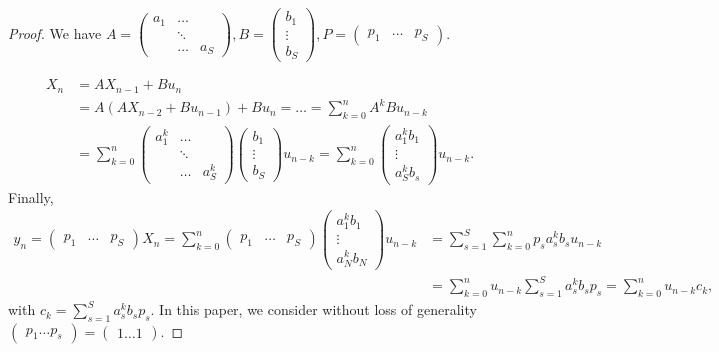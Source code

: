 \begin{proof}
    We have $A = \begin{pmatrix}
        a_1 & \dots & \\
        & \ddots & \\
        & \dots & a_S
    \end{pmatrix}, B = \begin{pmatrix}
        b_1\\
        \vdots\\
        b_S
    \end{pmatrix}, P = \begin{pmatrix}
        p_1 & \dots & p_S
    \end{pmatrix}$.

\begin{align*}
    X_n &= AX_{n-1} + Bu_n\\
    &= A(AX_{n-2} + Bu_{n-1}) + Bu_n  = \dots = \sum_{k=0}^nA^kBu_{n-k}\\
    &= \sum_{k=0}^n\begin{pmatrix}
        a_1^k & \dots & \\
        & \ddots & \\
        & \dots & a_S^k
    \end{pmatrix}\begin{pmatrix}
        b_1\\\vdots\\b_S
    \end{pmatrix}u_{n-k} = \sum_{k=0}^n\begin{pmatrix}
        a_1^kb_1\\\vdots \\a_S^kb_s
    \end{pmatrix}u_{n-k}.
\end{align*}
Finally,
\begin{align*}
    y_n = \begin{pmatrix}
        p_1 & \dots & p_S
    \end{pmatrix}X_n = \sum_{k=0}^n\begin{pmatrix}
        p_1 & \dots & p_S
    \end{pmatrix}\begin{pmatrix}
        a_1^kb_1\\\vdots\\a_N^kb_N
    \end{pmatrix}u_{n-k} & = \sum_{s=1}^S\sum_{k=0}^np_sa_s^kb_su_{n-k}\\
    &=\sum_{k=0}^nu_{n-k}\sum_{s=1}^Sa_s^kb_sp_s = \sum_{k=0}^nu_{n-k}c_k,
\end{align*}
with $c_k = \sum_{s=1}^Sa_s^kb_sp_s$. In this paper, we consider without loss of generality $\begin{pmatrix}
p_1 \dots p_s
\end{pmatrix} = \begin{pmatrix}
    1 \dots 1
\end{pmatrix}.$
\end{proof}
